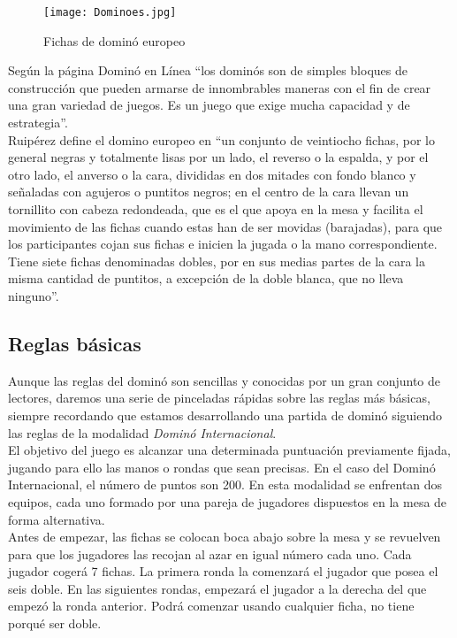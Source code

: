 \begin{figure}[h]
  \begin{center}
    \texttt{[image: Dominoes.jpg]}
  \end{center}
  \caption{Fichas de dominó europeo}
  \label{Dominoes}
\end{figure}

Según la página Dominó en Línea \cite{website:dominoenlinea} “los dominós son de simples bloques de construcción
que pueden armarse de innombrables maneras con el fin de crear una gran variedad de juegos. Es un
juego que exige mucha capacidad y de estrategia”. \\

Ruipérez define el domino europeo en “un conjunto de veintiocho fichas, por lo general negras y
totalmente lisas por un lado, el reverso o la espalda, y por el otro lado, el anverso o la cara,
divididas en dos mitades con fondo blanco y señaladas con agujeros o puntitos negros; en el centro
de la cara llevan un tornillito con cabeza redondeada, que es el que apoya en la mesa y facilita
el movimiento de las fichas cuando estas han de ser movidas (barajadas), para que los participantes
cojan sus fichas e inicien la jugada o la mano correspondiente. Tiene siete fichas denominadas
dobles, por en sus medias partes de la cara la misma cantidad de puntitos, a excepción de la
doble blanca, que no lleva ninguno”. \\

\subsection{Reglas básicas}

Aunque las reglas del dominó son sencillas y conocidas por un gran conjunto de lectores, daremos una
serie de pinceladas rápidas sobre las reglas más básicas, siempre recordando que estamos desarrollando
una partida de dominó siguiendo las reglas de la modalidad \emph{Dominó Internacional}. \\

El objetivo del juego es alcanzar una determinada puntuación previamente fijada, jugando para ello las
manos o rondas que sean precisas. En el caso del Dominó Internacional, el número de puntos son 200. En esta modalidad se enfrentan dos equipos, cada uno formado por una pareja de jugadores dispuestos en la mesa de forma alternativa. \\

Antes de empezar, las fichas se colocan boca abajo sobre la mesa y se revuelven para que los jugadores
las recojan al azar en igual número cada uno. Cada jugador cogerá 7 fichas. La primera ronda la comenzará
el jugador que posea el seis doble. En las siguientes rondas, empezará el jugador a la derecha del que
empezó la ronda anterior. Podrá comenzar usando cualquier ficha, no tiene porqué ser doble. \\

